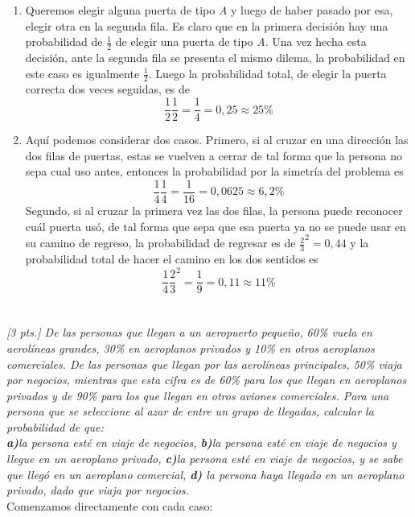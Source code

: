 \documentclass[11pt]{article}
\renewcommand{\(}{\left(}
\renewcommand{\)}{\right)}
\begin{document}
\begin{enumerate}
	\item Queremos elegir alguna puerta de tipo \textit{A} y luego de haber pasado por esa, elegir otra en la segunda fila. Es claro que en la primera decisión hay una probabilidad de $\frac{1}{2}$ de elegir una puerta de tipo \textit{A}. Una vez hecha esta decisión, ante la segunda fila se presenta el mismo dilema, la probabilidad en este caso es igualmente $\frac{1}{2}$. Luego la probabilidad total, de elegir la puerta correcta dos veces seguidas, es de $$\frac{1}{2} \frac{1}{2} = \frac{1}{4} = 0,25 \approx 25\%$$
	\item Aquí podemos considerar dos casos. Primero, si al cruzar en una dirección las dos filas de puertas, estas se vuelven a cerrar de tal forma que la persona no sepa cual uso antes, entonces la probabilidad por la simetría del problema es $$\frac{1}{4} \frac{1}{4} =  \frac{1}{16} = 0,0625 \approx 6,2\%$$
	Segundo, si al cruzar la primera vez las dos filas, la persona puede reconocer cuál puerta usó, de tal forma que sepa que esa puerta ya no se puede usar en su camino de regreso, la probabilidad de regresar es de $\frac{2}{3}^2 = 0,44$ y la probabilidad total de hacer el camino en los dos sentidos es $$ \frac{1}{4} \frac{2}{3}^2 = \frac{1}{9} = 0,11 \approx 11\%$$
\end{enumerate}

\section{}

\textit{[3 pts.] De las personas que llegan a un aeropuerto pequeño, 60\% vuela en aerolíneas grandes, 30\% en aeroplanos privados y 10\% en otros aeroplanos comerciales. De las personas que llegan por las aerolíneas principales, 50\% viaja por negocios, mientras que esta cifra es de 60\% para los que llegan en aeroplanos privados y de 90\% para los que llegan en otros aviones comerciales. Para una persona que se seleccione al azar de entre un grupo de llegadas, calcular la probabilidad de que: \\ \textbf{a)}la persona esté en viaje de negocios, \textbf{b)}la persona esté en viaje de negocios y llegue en un aeroplano privado, \textbf{c)}la persona esté en viaje de negocios, y se sabe que llegó en un aeroplano comercial, \textbf{d)} la persona haya llegado en un aeroplano privado, dado que viaja por negocios.} \\

Comenzamos directamente con cada caso:
\end{document}
